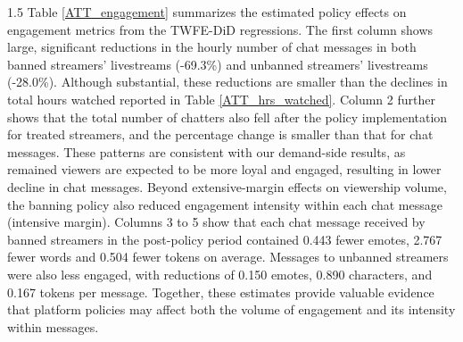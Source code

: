 \documentclass[a4paper,12pt]{article}
\begin{document}
\begin{spacing}{1.5}
Table \ref{ATT_engagement} summarizes the estimated policy effects on engagement metrics from the TWFE-DiD regressions. The first column shows large, significant reductions in the hourly number of chat messages in both banned streamers' livestreams (-69.3\%) and unbanned streamers' livestreams (-28.0\%). Although substantial, these reductions are smaller than the declines in total hours watched reported in Table \ref{ATT_hrs_watched}. Column 2 further shows that the total number of chatters also fell after the policy implementation for treated streamers, and the percentage change is smaller than that for chat messages. These patterns are consistent with our demand-side results, as remained viewers are expected to be more loyal and engaged, resulting in lower decline in chat messages. Beyond extensive-margin effects on viewership volume, the banning policy also reduced engagement intensity within each chat message (intensive margin). Columns 3 to 5 show that each chat message received by banned streamers in the post-policy period contained 0.443 fewer emotes, 2.767 fewer words and 0.504 fewer tokens on average. Messages to unbanned streamers were also less engaged, with reductions of 0.150 emotes, 0.890 characters, and 0.167 tokens per message. Together, these estimates provide valuable evidence that platform policies may affect both the volume of engagement and its intensity within messages.


\end{spacing}
\end{document}
